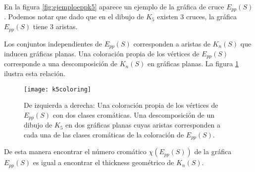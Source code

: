 En la figura \ref{fig:ejemploeppk5} aparece un ejemplo de la gráfica de cruce $E_{pp}(S)$.
Podemos notar que dado que en el dibujo de $K_5$ existen 3 cruces, la gráfica $E_{pp}(S)$
tiene 3 aristas.

Los conjuntos independientes de $E_{pp}(S)$ corresponden a aristas de $K_n(S)$
que inducen gráficas planas. Una coloración propia de los vértices de $E_{pp}(S)$
corresponde a una descomposición de $K_n(S)$ en gráficas planas.
La figura \ref{fig:k5coloring} ilustra esta relación.

\begin{figure}
  \centering
  \texttt{[image: k5coloring]}
  \caption{De izquierda a derecha: Una coloración propia de los vértices de $E_{pp}(S)$ con dos
  clases cromáticas. Una descomposición de un dibujo de $K_5$ en dos gráficas planas
  cuyas aristas corresponden a cada una de las clases cromáticas de la coloración
  de $E_{pp}(S)$.}
  \label{fig:k5coloring}
\end{figure}

De esta manera encontrar el número cromático $\chi(E_{pp}(S))$ de la gráfica
$E_{pp}(S)$ es igual a encontrar el thickness geométrico de $K_n(S)$.



